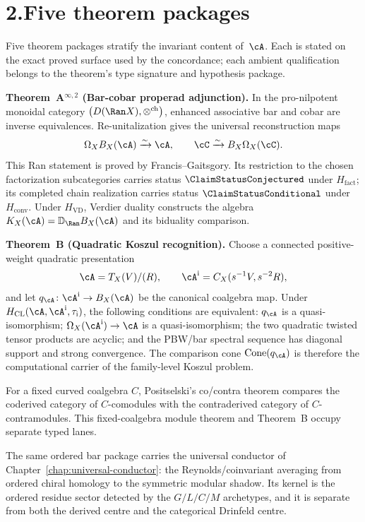 \section*{2.\quad Five theorem packages}

\noindent
Five theorem packages stratify the invariant content of~$\cA$.
Each is stated on the exact proved surface used by the concordance;
each ambient qualification belongs to the theorem's type signature
and hypothesis package.

\medskip

\noindent\textbf{Theorem~A$^{\infty,2}$ (Bar-cobar properad
adjunction).}\enspace
In the pro-nilpotent monoidal category
$\bigl(D(\Ran X),\otimes^{\mathrm{ch}}\bigr)$, enhanced associative
bar and cobar are inverse equivalences.  Re-unitalization gives the
universal reconstruction maps
\[
 \Omega_XB_X(\cA)\xrightarrow{\sim}\cA,
 \qquad
 \cC\xrightarrow{\sim}B_X\Omega_X(\cC).
\]
This Ran statement is proved by Francis--Gaitsgory.  Its restriction
to the chosen factorization subcategories carries status
$\ClaimStatusConjectured$ under $H_{\mathrm{fact}}$; its completed
chain realization carries status $\ClaimStatusConditional$ under
$H_{\mathrm{conv}}$.  Under $H_{\mathrm{VD}}$, Verdier duality
constructs the algebra
$K_X(\cA)=\mathbb D_{\Ran}B_X(\cA)$ and its biduality comparison.

\medskip

\noindent\textbf{Theorem~B (Quadratic Koszul recognition).}\enspace
Choose a connected positive-weight quadratic presentation
\[
 \cA=T_X(V)/(R),
 \qquad
 \cA^{\mathrm i}=C_X(s^{-1}V,s^{-2}R),
\]
and let
$q_\cA\colon\cA^{\mathrm i}\to B_X(\cA)$ be the canonical coalgebra
map.  Under
$H_{\mathrm{CL}}(\cA,\cA^{\mathrm i},\tau_{\mathrm i})$, the
following conditions are equivalent: $q_\cA$ is a quasi-isomorphism;
$\Omega_X(\cA^{\mathrm i})\to\cA$ is a quasi-isomorphism; the two
quadratic twisted tensor products are acyclic; and the PBW/bar
spectral sequence has diagonal support and strong convergence.  The
comparison cone $\operatorname{Cone}(q_\cA)$ is therefore the
computational carrier of the family-level Koszul problem.

For a fixed curved coalgebra $C$, Positselski's co/contra theorem
compares the coderived category of $C$-comodules with the
contraderived category of $C$-contramodules.  This fixed-coalgebra
module theorem and Theorem~B occupy separate typed lanes.

The same ordered bar package carries the universal conductor of
Chapter~\ref{chap:universal-conductor}: the Reynolds/coinvariant
averaging from ordered chiral homology to the symmetric modular
shadow. Its kernel is the ordered residue sector detected by the
$G/L/C/M$ archetypes, and it is separate from both the derived centre
and the categorical Drinfeld centre.

